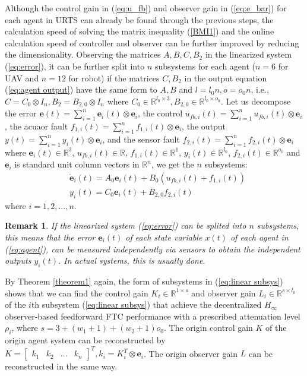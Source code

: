 \documentclass{ieeeaccess}
\newtheorem{remark}{Remark}
\begin{document}
Although the control gain in (\ref{eq:u_fb}) and observer gain in (\ref{eq:e_bar}) for each agent in URTS can already be found through the previous steps, the calculation speed of solving the matrix inequality (\ref{BMI1}) and the online calculation speed of controller and observer can be further improved by reducing the dimensionality. Observing the matrices $A,B,C,B_2$ in the linearized system (\ref{eq:error}), it can be further split into $n$ subsystems for each agent ($n=6$ for UAV and $n=12$ for robot) if the matrices $C,B_2$ in the output equation (\ref{eq:agent output}) have the same form to $A,B$ and $l=l_0n, o=o_0n$, i.e., $C = C_0\otimes I_n,B_2 = B_{2,0}\otimes I_n$ where $C_0\in\mathbb{R}^{l_0\times 3},B_{2,0}\in\mathbb{R}^{l_0\times o_0}$. Let us decompose 
the error $\pmb{e}(t)=\sum_{i=1}^{n} \pmb{e}_i(t)\otimes\mathbf{e}_i$, 
the control $u_{fb,i}(t)=\sum_{i=1}^{n} {u}_{fb,i}(t)\otimes\mathbf{e}_i$, 
the acuaor fault $f_{1,i}(t)=\sum_{i=1}^{n} {f}_{1,i}(t)\otimes\mathbf{e}_i$, 
the output $y(t)=\sum_{i=1}^{n} {y}_i(t)\otimes\mathbf{e}_i$, 
and the sensor fault $f_{2,i}(t)=\sum_{i=1}^{n} {f}_{2,i}(t)\otimes\mathbf{e}_i$ 
where $\pmb{e}_i(t)\in\mathbb{R}^3$, $u_{fb,i}(t)\in\mathbb{R}$, $f_{1,i}(t)\in\mathbb{R}^1$, $y_i(t)\in\mathbb{R}^{l_0}$, $f_{2,i}(t)\in\mathbb{R}^{o_0}$ and $\mathbf{e}_i$ is standard unit column vectors in $\mathbb{R}^n$, we get the $n$ subsystems:
\begin{equation} \label{eq:linear subsys}
    \begin{split}
        & \dot{\pmb{e}}_i(t)=A_0\pmb{e}_i(t)+B_0(u_{fb,i}(t)+f_{1,i}(t)) \\
        & {y}_i(t)=C_0\pmb{e}_i(t)+B_{2,0}f_{2,i}(t)   
    \end{split}
\end{equation} where $i=1,2,...,n$.
\begin{remark}
    If the linearized system (\ref{eq:error}) can be splited into $n$ subsystems, this means that the error $\pmb{e}_i(t)$ of each state variable $x(t)$ of each agent in (\ref{eq:agent}), can be measured independently via sensors to obtain the independent outputs $y_i(t)$. In actual systems, this is usually done.
\end{remark}

By Theorem \ref{theorem1} again, the form of subsystems in (\ref{eq:linear subsys}) shows that we can find the control gain $K_i\in\mathbb{R}^{1\times s}$ and observer gain $L_i\in\mathbb{R}^{s\times l_0}$ of the $i$th subsystem (\ref{eq:linear subsys}) that achieve the decentralized $H_\infty$ observer-based feedforward FTC performance with a prescribed attenuation level $\rho_i$, where $s=3+(w_1+1)+(w_2+1)o_0$. The origin control gain $K$ of the origin agent system can be reconstructed by $K = \begin{bmatrix}
    \mathit{k}_1 & \mathit{k}_2 & ... & \mathit{k}_n
\end{bmatrix}^T, \mathit{k}_i=K_i^T\otimes\mathbf{e}_i$. The origin observer gain $L$ can be reconstructed in the same way. 
\end{document}
